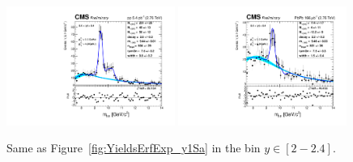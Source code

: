 \begin{figure}
  \includegraphics[width=0.49\textwidth]{Chapters/aYield/pp/pt_3p5_4/Rap/Rap_2_2p4/pp2p76tev_Rap_2_2p4_fsr1.pdf}
  \includegraphics[width=0.49\textwidth]{Chapters/aYield/PbPb/pt_3p5_4/Rap/Rap_2_2p4/PbPb_Rap_2_2p4_fsr1.pdf}
  \caption{Same as Figure~\ref{fig:YieldsErfExp_y1Sa} in the bin $y\in [2 - 2.4]$.}
  \label{fig:YieldsErfExp_y1Sf} 
\end{figure}

